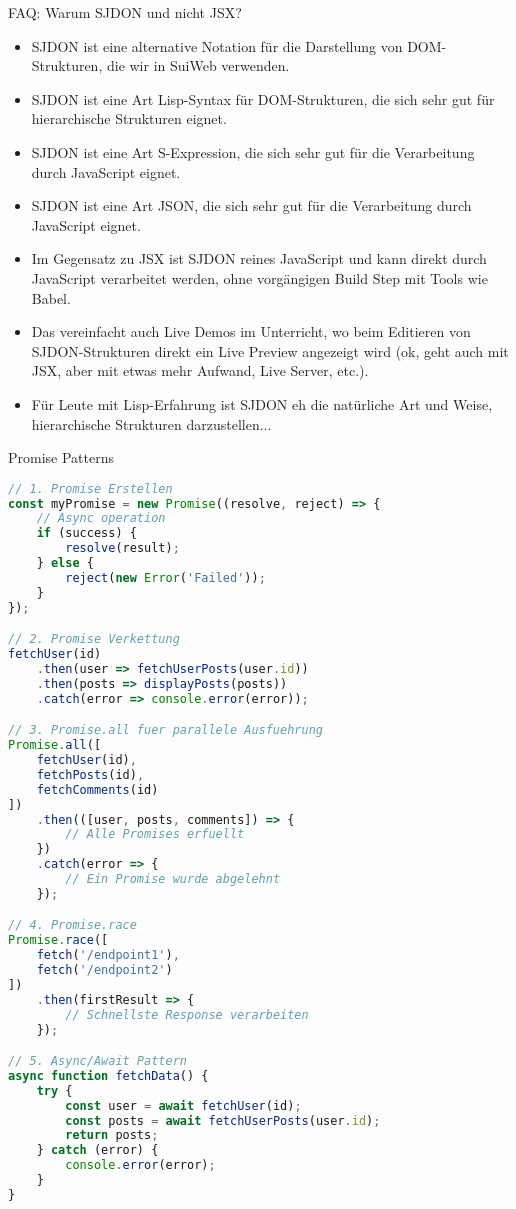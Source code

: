 \begin{example2}{FAQ: Warum SJDON und nicht JSX?}
    \begin{itemize}
        \item SJDON ist eine alternative Notation für die Darstellung von DOM-Strukturen, die wir in SuiWeb verwenden.
        \item SJDON ist eine Art Lisp-Syntax für DOM-Strukturen, die sich sehr gut für hierarchische Strukturen eignet.
        \item SJDON ist eine Art S-Expression, die sich sehr gut für die Verarbeitung durch JavaScript eignet.
        \item SJDON ist eine Art JSON, die sich sehr gut für die Verarbeitung durch JavaScript eignet.
        \item Im Gegensatz zu JSX ist SJDON reines JavaScript und kann direkt durch JavaScript verarbeitet werden, ohne vorgängigen Build Step mit Tools wie Babel.
        \item Das vereinfacht auch Live Demos im Unterricht, wo beim Editieren von SJDON-Strukturen direkt ein Live Preview angezeigt wird (ok, geht auch mit JSX, aber mit etwas mehr Aufwand, Live Server, etc.).
        \item Für Leute mit Lisp-Erfahrung ist SJDON eh die natürliche Art und Weise, hierarchische Strukturen darzustellen...
    \end{itemize}
\end{example2}

\begin{KR}{Promise Patterns}
\begin{lstlisting}[language=JavaScript, style=basesmol]
// 1. Promise Erstellen
const myPromise = new Promise((resolve, reject) => {
    // Async operation
    if (success) {
        resolve(result);
    } else {
        reject(new Error('Failed'));
    }
});

// 2. Promise Verkettung
fetchUser(id)
    .then(user => fetchUserPosts(user.id))
    .then(posts => displayPosts(posts))
    .catch(error => console.error(error));

// 3. Promise.all fuer parallele Ausfuehrung
Promise.all([
    fetchUser(id),
    fetchPosts(id),
    fetchComments(id)
])
    .then(([user, posts, comments]) => {
        // Alle Promises erfuellt
    })
    .catch(error => {
        // Ein Promise wurde abgelehnt
    });

// 4. Promise.race
Promise.race([
    fetch('/endpoint1'),
    fetch('/endpoint2')
])
    .then(firstResult => {
        // Schnellste Response verarbeiten
    });

// 5. Async/Await Pattern
async function fetchData() {
    try {
        const user = await fetchUser(id);
        const posts = await fetchUserPosts(user.id);
        return posts;
    } catch (error) {
        console.error(error);
    }
}
\end{lstlisting}
\end{KR}

